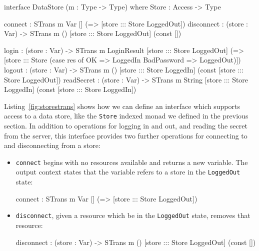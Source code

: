 \small
\begin{code}[float=h, frame=single,caption={An interface for the data
store, using \texttt{STrans} to describe the state transitions in each
operation},label=fig:storestrans]
interface DataStore (m : Type -> Type) where
  Store : Access -> Type

  connect : STrans m Var [] (\store => [store ::: Store LoggedOut])
  disconnect : (store : Var) -> STrans m () [store ::: Store LoggedOut] (const [])

  login : (store : Var) ->
          STrans m LoginResult 
                   [store ::: Store LoggedOut]
          (\res => [store ::: Store (case res of
                                          OK => LoggedIn
                                          BadPassword => LoggedOut)])
  logout : (store : Var) ->
           STrans m () [store ::: Store LoggedIn]
                (const [store ::: Store LoggedOut])
  readSecret : (store : Var) ->
               STrans m String [store ::: Store LoggedIn]
                        (const [store ::: Store LoggedIn])
\end{code}
\normalsize

Listing~\ref{fig:storestrans}
shows how we can define an interface which supports access to a data
store, like the \texttt{Store} indexed monad we defined in the previous
section.
%
In addition to operations for logging in and out, and reading the secret
from the server, this interface provides two further operations for
connecting to and disconnecting from a store:

\begin{itemize}
\item \texttt{connect} begins with no resources available and returns a new
variable. The output context states that the variable refers to a store
in the \texttt{LoggedOut} state:

\small
\begin{code}
connect : STrans m Var [] (\store => [store ::: Store LoggedOut])
\end{code}
\normalsize

\item \texttt{disconnect}, given a resource which  be in the
\texttt{LoggedOut} state, removes that resource:

\small
\begin{code}
disconnect : (store : Var) ->
             STrans m () [store ::: Store LoggedOut] (const [])
\end{code}
\normalsize

\end{itemize}

